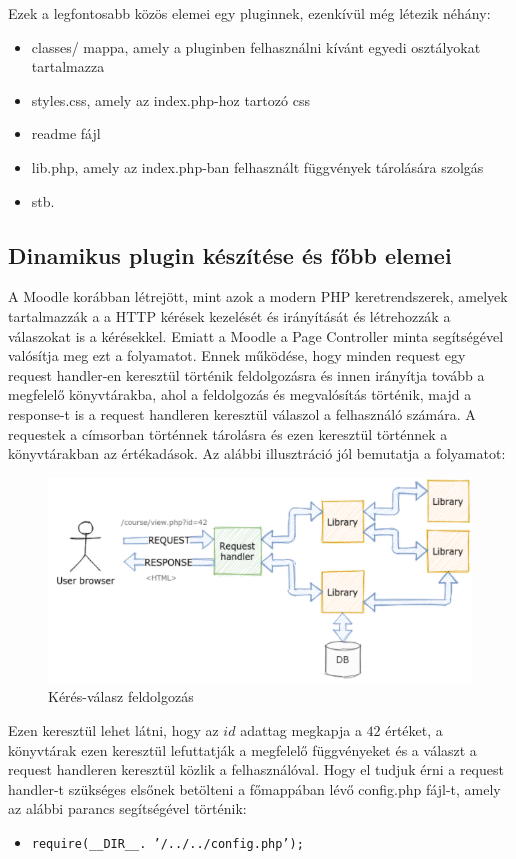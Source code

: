 Ezek a legfontosabb közös elemei egy pluginnek, ezenkívül még létezik néhány:
\begin{itemize}
    \item classes/ mappa, amely a pluginben felhasználni kívánt egyedi osztályokat tartalmazza
    \item styles.css, amely az index.php-hoz tartozó css
    \item readme fájl
    \item lib.php, amely az index.php-ban felhasznált függvények tárolására szolgás
    \item stb.
\end{itemize}

\subsection{Dinamikus plugin készítése és főbb elemei}

A Moodle korábban létrejött, mint azok a modern PHP keretrendszerek, amelyek tartalmazzák a a HTTP kérések kezelését és irányítását és létrehozzák a válaszokat is a kérésekkel. Emiatt a Moodle a Page Controller minta segítségével valósítja meg ezt a folyamatot. Ennek működése, hogy minden request egy request handler-en keresztül történik feldolgozásra és innen irányítja tovább a megfelelő könyvtárakba, ahol a feldolgozás és megvalósítás történik, majd a response-t is a request handleren keresztül válaszol a felhasználó számára. A requestek a címsorban történnek tárolásra és ezen keresztül történnek a könyvtárakban az értékadások. Az alábbi illusztráció jól bemutatja a folyamatot:
\begin{figure}
    \centering
    \includegraphics[scale=0.7]{Fejezetek/Images/requestHandler.png}
    \caption{Kérés-válasz feldolgozás \cite{MoodleTutorial}}
\end{figure}
Ezen keresztül lehet látni, hogy az $id$ adattag megkapja a $42$ értéket, a könyvtárak ezen keresztül lefuttatják a megfelelő függvényeket és a választ a request handleren keresztül közlik a felhasználóval. Hogy el tudjuk érni a request handler-t szükséges elsőnek betölteni a főmappában lévő config.php fájl-t, amely az alábbi parancs segítségével történik: \par
\begin{itemize}
    \item[] \texttt{require(\_\_DIR\_\_. '/../../config.php');}
\end{itemize}

